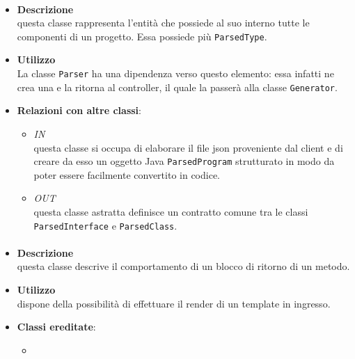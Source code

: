 \paragraph{}
\label{\nogloxy{SWEDesigner::Server::Project::ParsedProgram}}
\begin{itemize}
\item \textbf{Descrizione}\\
questa classe rappresenta l'entità che possiede al suo interno tutte le componenti di un progetto. Essa possiede più \texttt{ParsedType}.
\item \textbf{Utilizzo}\\
La classe \texttt{Parser} ha una dipendenza verso questo elemento: essa infatti ne crea una e la ritorna al controller, il quale la passerà alla classe \texttt{Generator}.
\item \textbf{Relazioni con altre classi}:
\begin{itemize}
\item \textit{IN} \hyperref[\nogloxy{SWEDesigner::Server::Parser::Parser}]{}\\
questa classe si occupa di elaborare il file json proveniente dal client e di creare da esso un oggetto Java \texttt{ParsedProgram} strutturato in modo da poter essere facilmente convertito in codice.
\item \textit{OUT} \hyperref[\nogloxy{SWEDesigner::Server::Project::ParsedType}]{}\\
questa classe astratta definisce un contratto comune tra le classi \texttt{ParsedInterface} e \texttt{ParsedClass}. 
\end{itemize}
\end{itemize}

\paragraph{}
\label{\nogloxy{SWEDesigner::Server::Project::ParsedReturn}}
\begin{itemize}
\item \textbf{Descrizione}\\
questa classe descrive il comportamento di un blocco di ritorno di un metodo.
\item \textbf{Utilizzo}\\
dispone della possibilità di effettuare il render di un template in ingresso.
\item \textbf{Classi ereditate}:
\begin{itemize}
\item \hyperref[\nogloxy{SWEDesigner::Server::Project::ParsedInstruction}]{}
\end{itemize}
\end{itemize}

